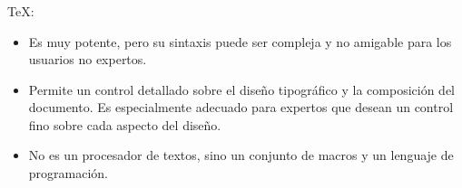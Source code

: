 \documentclass{beamer}
\begin{document}
\begin{frame}
  \frametitle{}
  
  \begin{block}{\TeX:}
    \begin{itemize}
    \item Es muy potente, pero su sintaxis puede ser compleja y no amigable para
      los usuarios no expertos.
      \pause
    \item Permite un control detallado sobre el diseño tipogr\'afico
      y la composici\'on del documento.
      Es especialmente adecuado para expertos que desean un control fino sobre
      cada aspecto del dise\~no.
      \pause
    \item No es un procesador de textos, sino un conjunto de macros y un
      lenguaje de programaci\'on.
    \end{itemize}
  \end{block}
\end{frame}

\end{document}
